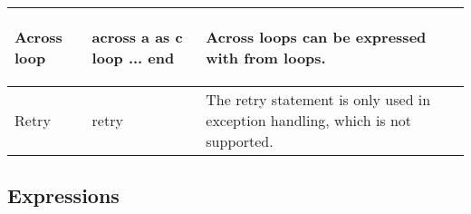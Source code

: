 \begin{longtable}{|l|l|m{6.8cm}|}
Across loop
\cellcolor{none}
&
{\begin{erunning}
across a as c
loop ...
end
\end{erunning}}
&
Across loops can be expressed with from loops.
\\ \hline


Retry
\cellcolor{none}
&
{\begin{erunning}
retry
\end{erunning}}
&
The retry statement is only used in exception handling, which is not supported.
\\ \hline
\end{longtable}


\subsection{Expressions} 

